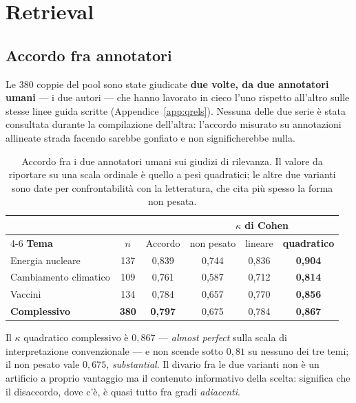 \documentclass[11pt,a4paper]{report}
\begin{document}
\section{Retrieval}\label{sec:ris-retrieval}

\subsection{Accordo fra annotatori}
Le 380 coppie del pool sono state giudicate \textbf{due volte, da due annotatori umani} --- i due
autori --- che hanno lavorato in cieco l'uno rispetto all'altro sulle stesse linee guida scritte
(Appendice~\ref{app:qrels}). Nessuna delle due serie è stata consultata durante la compilazione
dell'altra: l'accordo misurato su annotazioni allineate strada facendo sarebbe gonfiato e non
significherebbe nulla.

\begin{table}[t]
\centering
\small
\begin{tabular}{lccccc}
\toprule
& & & \multicolumn{3}{c}{\textbf{$\kappa$ di Cohen}} \\
\cmidrule(lr){4-6}
\textbf{Tema} & \textbf{$n$} & Accordo & non pesato & lineare & \textbf{quadratico} \\
\midrule
Energia nucleare & 137 & 0,839 & 0,744 & 0,836 & \textbf{0,904} \\
Cambiamento climatico & 109 & 0,761 & 0,587 & 0,712 & \textbf{0,814} \\
Vaccini & 134 & 0,784 & 0,657 & 0,770 & \textbf{0,856} \\
\midrule
\textbf{Complessivo} & \textbf{380} & \textbf{0,797} & 0,675 & 0,784 & \textbf{0,867} \\
\bottomrule
\end{tabular}
\caption{Accordo fra i due annotatori umani sui giudizi di rilevanza. Il valore da riportare su una
scala ordinale è quello a pesi quadratici; le altre due varianti sono date per confrontabilità con
la letteratura, che cita più spesso la forma non pesata.}
\label{tab:kappa}
\end{table}

Il $\kappa$ quadratico complessivo è $0{,}867$ --- \emph{almost perfect} sulla scala di
interpretazione convenzionale --- e non scende sotto $0{,}81$ su nessuno dei tre temi; il non
pesato vale $0{,}675$, \emph{substantial}. Il divario fra le due varianti non è un artificio a
proprio vantaggio ma il contenuto informativo della scelta: significa che il disaccordo, dove c'è,
è quasi tutto fra gradi \emph{adiacenti}.
\end{document}
